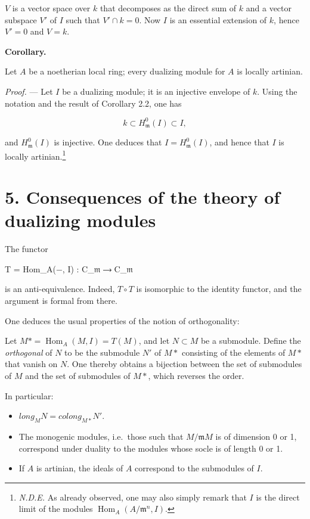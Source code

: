\documentclass[
  11pt,
  a4paper,
]{book}
\newenvironment{Shaded}{}{}
\newcommand{\NormalTok}[1]{#1}
\providecommand{\tightlist}{%
  \setlength{\itemsep}{0pt}\setlength{\parskip}{0pt}}
\begin{document}
\(V\) is a vector space over \(k\) that decomposes as the direct sum of
\(k\) and a vector subspace \(V'\) of \(I\) such that \(V'
\cap k = 0\). Now \(I\) is an essential extension of \(k\), hence
\(V' = 0\) and \(V = k\).

\textbf{Corollary.}

Let \(A\) be a noetherian local ring; every dualizing module for \(A\)
is locally artinian.

\emph{Proof.} --- Let \(I\) be a dualizing module; it is an injective
envelope of \(k\). Using the notation and the result of Corollary 2.2,
one has

\[ k \subset H^{0}_{\mathfrak{m}}(I) \subset I, \]

and \(H^{0}_{\mathfrak{m}}(I)\) is injective. One deduces that
\(I = H^{0}_{\mathfrak{m}}(I)\), and hence that \(I\) is locally
artinian.\footnote{\emph{N.D.E.} As already observed, one may also
  simply remark that \(I\) is the direct limit of the modules
  \(\operatorname{Hom}_{A}(A/\mathfrak{m}^{n}, I)\).}

\section{5. Consequences of the theory of dualizing
modules}\label{consequences-of-the-theory-of-dualizing-modules}

The functor

\begin{Shaded}
\begin{Highlighting}[]
\NormalTok{T = Hom\_A(−, I) : C\_𝔪 ⟶ C\_𝔪}
\end{Highlighting}
\end{Shaded}

is an anti-equivalence. Indeed, \(T \circ T\) is isomorphic to the
identity functor, and the argument is formal from there.

One deduces the usual properties of the notion of orthogonality:

Let \(M* = \operatorname{Hom}_{A}(M, I) = T(M)\), and let
\(N \subset M\) be a submodule. Define the \emph{orthogonal} of \(N\) to
be the submodule \(N'\) of \(M*\) consisting of the elements of \(M*\)
that vanish on \(N\). One thereby obtains a bijection between the set of
submodules of \(M\) and the set of submodules of \(M*\), which reverses
the order.

In particular:

\begin{itemize}
\tightlist
\item
  \(long_{M} N = colong_{M*} N'\).
\item
  The monogenic modules, i.e.~those such that \(M/\mathfrak{m}M\) is of
  dimension 0 or 1, correspond under duality to the modules whose socle
  is of length 0 or 1.
\item
  If \(A\) is artinian, the ideals of \(A\) correspond to the submodules
  of \(I\).
\end{itemize}
\end{document}
